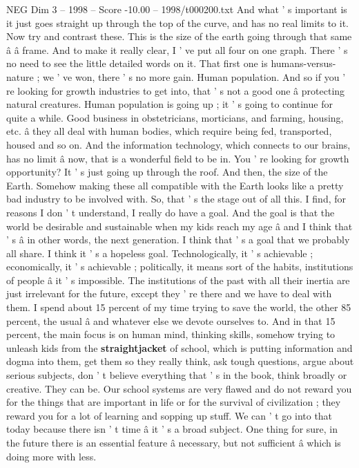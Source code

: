 \begin{textsample}{NEG Dim 3 – 1998 – Score -10.00 – 1998/t000200.txt}
And what ' s important is it just goes straight up through the top of the curve, and has no real limits to it.
Now try and contrast these.
This is the size of the earth going through that same â â frame.
And to make it really clear, I ' ve put all four on one graph.
There ' s no need to see the little detailed words on it.
That first one is humans-versus-nature ; we ' ve won, there ' s no more gain.
Human population.
And so if you ' re looking for growth industries to get into, that ' s not a good one â protecting natural creatures.
Human population is going up ; it ' s going to continue for quite a while.
Good business in obstetricians, morticians, and farming, housing, etc. â they all deal with human bodies, which require being fed, transported, housed and so on.
And the information technology, which connects to our brains, has no limit â now, that is a wonderful field to be in.
You ' re looking for growth opportunity?
It ' s just going up through the roof.
And then, the size of the Earth.
Somehow making these all compatible with the Earth looks like a pretty bad industry to be involved with.
So, that ' s the stage out of all this.
I find, for reasons I don ' t understand, I really do have a goal.
And the goal is that the world be desirable and sustainable when my kids reach my age â and I think that ' s â in other words, the next generation.
I think that ' s a goal that we probably all share.
I think it ' s a hopeless goal.
Technologically, it ' s achievable ; economically, it ' s achievable ; politically, it means sort of the habits, institutions of people â it ' s impossible.
The institutions of the past with all their inertia are just irrelevant for the future, except they ' re there and we have to deal with them.
I spend about 15 percent of my time trying to save the world, the other 85 percent, the usual â and whatever else we devote ourselves to.
And in that 15 percent, the main focus is on human mind, thinking skills, somehow trying to unleash kids from the \textbf{straightjacket} of school, which is putting information and dogma into them, get them so they really think, ask tough questions, argue about serious subjects, don ' t believe everything that ' s in the book, think broadly or creative.
They can be.
Our school systems are very flawed and do not reward you for the things that are important in life or for the survival of civilization ; they reward you for a lot of learning and sopping up stuff.
We can ' t go into that today because there isn ' t time â it ' s a broad subject.
One thing for sure, in the future there is an essential feature â necessary, but not sufficient â which is doing more with less.

\end{textsample}
